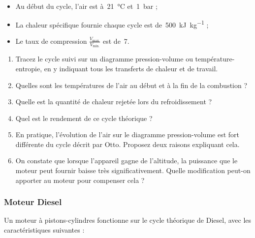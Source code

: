 	\begin{itemize}
		\item Au début du cycle, l’air est à~\SI{21}{\degreeCelsius} et~\SI{1}{\bar} ; 
		\item La chaleur spécifique fournie chaque cycle est de~\SI{500}{\kilo\joule\per\kilogram} ;
		\item Le taux de compression $\frac{V_\text{max.}}{V_\text{min.}}$ est de~\num{7}.
	\end{itemize}

	\begin{enumerate}
		\item Tracez le cycle suivi sur un diagramme pression-volume ou température-entropie, en y indiquant tous les transferts de chaleur et de travail.
		\item Quelles sont les températures de l’air au début et à la fin de la combustion ?
		\item Quelle est la quantité de chaleur rejetée lors du refroidissement ?
		\item Quel est le rendement de ce cycle théorique ?
		\item En pratique, l’évolution de l’air sur le diagramme pression-volume est fort différente du cycle décrit par Otto. Proposez deux raisons expliquant cela.
		\item On constate que lorsque l’appareil gagne de l’altitude, la puissance que le moteur peut fournir baisse très significativement. Quelle modification peut-on apporter au moteur pour compenser cela ?
	\end{enumerate}


\subsubsection{Moteur Diesel}


	Un moteur à pistons-cylindres fonctionne sur le cycle théorique de Diesel, avec les caractéristiques suivantes :
	
